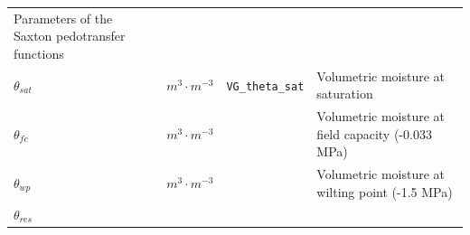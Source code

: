 \documentclass[]{book}
\begin{document}
\begin{longtable}[]{@{}llll@{}}
\begin{minipage}[t]{0.45\columnwidth}
Parameters of the Saxton pedotransfer functions\strut
\end{minipage}\tabularnewline
\begin{minipage}[t]{0.11\columnwidth}\raggedright\strut
\(\theta_{sat}\)\strut
\end{minipage} & \begin{minipage}[t]{0.10\columnwidth}\raggedright\strut
\(m^3 \cdot m^{-3}\)\strut
\end{minipage} & \begin{minipage}[t]{0.12\columnwidth}\raggedright\strut
\texttt{VG\_theta\_sat}\strut
\end{minipage} & \begin{minipage}[t]{0.45\columnwidth}\raggedright\strut
Volumetric moisture at saturation\strut
\end{minipage}\tabularnewline
\begin{minipage}[t]{0.11\columnwidth}\raggedright\strut
\(\theta_{fc}\)\strut
\end{minipage} & \begin{minipage}[t]{0.10\columnwidth}\raggedright\strut
\(m^3 \cdot m^{-3}\)\strut
\end{minipage} & \begin{minipage}[t]{0.12\columnwidth}\raggedright\strut
\strut
\end{minipage} & \begin{minipage}[t]{0.45\columnwidth}\raggedright\strut
Volumetric moisture at field capacity (-0.033 MPa)\strut
\end{minipage}\tabularnewline
\begin{minipage}[t]{0.11\columnwidth}\raggedright\strut
\(\theta_{wp}\)\strut
\end{minipage} & \begin{minipage}[t]{0.10\columnwidth}\raggedright\strut
\(m^3 \cdot m^{-3}\)\strut
\end{minipage} & \begin{minipage}[t]{0.12\columnwidth}\raggedright\strut
\strut
\end{minipage} & \begin{minipage}[t]{0.45\columnwidth}\raggedright\strut
Volumetric moisture at wilting point (-1.5 MPa)\strut
\end{minipage}\tabularnewline
\begin{minipage}[t]{0.11\columnwidth}\raggedright\strut
\(\theta_{res}\)\strut
\end{minipage} & \begin{minipage}[t]{0.10\columnwidth}\raggedright\strut

\end{minipage}
\end{longtable}
\end{document}
